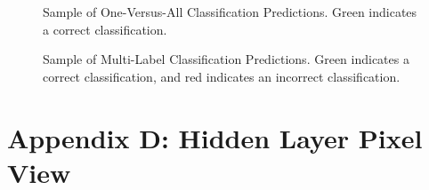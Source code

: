 \documentclass[]{article}
\begin{document}
\begin{figure}[h!]
	\centering	
	\caption{Sample of One-Versus-All Classification Predictions. Green indicates a correct classification.}
\end{figure}

\begin{figure}[h!]
	\centering	
	\caption{Sample of Multi-Label Classification Predictions. Green indicates a correct classification, and red indicates an incorrect classification.}
\end{figure}

\newpage
\section{Appendix D: Hidden Layer Pixel View}
\end{document}

